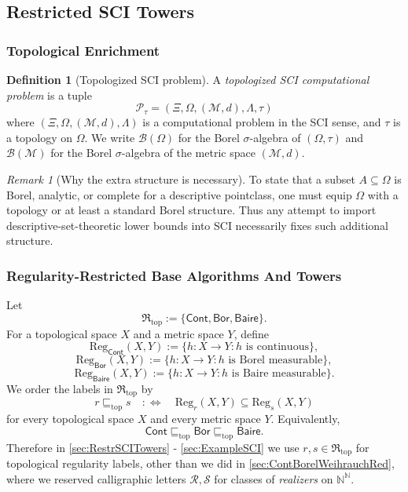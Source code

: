 \documentclass{lmcs} %
\theoremstyle{plain}
\theoremstyle{plain}
\theoremstyle{definition}
\newtheorem{definition}[theorem]{Definition}
\theoremstyle{remark}
\newtheorem{remark}[theorem]{Remark}
\theoremstyle{definition}
\theoremstyle{remark}
\numberwithin{equation}{section}
\newcommand{\Reg}{\mathrm{Reg}}
\newcommand{\Bor}{\mathsf{Bor}}
\newcommand{\Cont}{\mathsf{Cont}}
\newcommand{\BaireMeas}{\mathsf{Baire}}
\begin{document}
\subsection{Restricted SCI Towers}{\label{sec:RestrSCITowers}}

\subsubsection{Topological Enrichment}

\begin{definition}[Topologized SCI problem]\label{def:topoSCI}
A \textit{topologized SCI computational problem} is a tuple
\[
\mathcal{P}_\tau=(\Xi,\Omega,(\mathcal{M},d),\Lambda,\tau)
\]
where $(\Xi,\Omega,(\mathcal{M},d),\Lambda)$ is a computational problem in the SCI sense, and $\tau$ is a topology on $\Omega$.
We write $\mathcal{B}(\Omega)$ for the Borel $\sigma$-algebra of $(\Omega,\tau)$ and $\mathcal{B}(\mathcal{M})$ for the Borel $\sigma$-algebra of the metric space $(\mathcal{M},d)$.
\end{definition}

\begin{remark}[Why the extra structure is necessary]
To state that a subset \(A\subseteq\Omega\) is Borel, analytic, or complete for a
descriptive pointclass, one must equip \(\Omega\) with a topology or at least a standard
Borel structure. Thus any attempt to import descriptive-set-theoretic lower bounds
into SCI necessarily fixes such additional structure.
\end{remark}

\subsubsection{Regularity-Restricted Base Algorithms And Towers}
Let
\[
\mathfrak{R}_{\mathrm{top}} := \{\Cont,\Bor,\BaireMeas\}.
\]
For a topological space $X$ and a metric space $Y$, define
\[
\Reg_{\Cont}(X,Y) := \{h:X\to Y : h \text{ is continuous}\},
\]
\[
\Reg_{\Bor}(X,Y) := \{h:X\to Y : h \text{ is Borel measurable}\},
\]
\[
\Reg_{\BaireMeas}(X,Y) := \{h:X\to Y : h \text{ is Baire measurable}\}.
\]
We order the labels in $\mathfrak{R}_{\mathrm{top}}$ by
\[
r \sqsubseteq_{\mathrm{top}} s
\quad:\Longleftrightarrow\quad
\Reg_r(X,Y)\subseteq \Reg_s(X,Y)
\]
for every topological space $X$ and every metric space $Y$.
Equivalently,
\[
\Cont\sqsubseteq_{\mathrm{top}}\Bor
\sqsubseteq_{\mathrm{top}}\BaireMeas.
\]
Therefore in \cref{sec:RestrSCITowers} - \cref{sec:ExampleSCI} we use $r,s \in \mathfrak{R}_{\mathrm{top}}$ for topological regularity labels, other than we did in \cref{sec:ContBorelWeihrauchRed}, where we reserved calligraphic letters $\mathcal R,\mathcal S$ for classes of \textit{realizers} on $\mathbb{N}^{\mathbb{N}}$.
\end{document}
